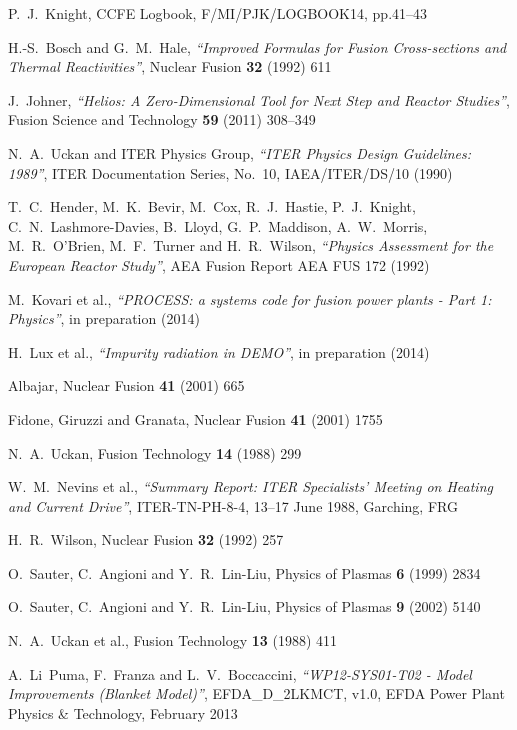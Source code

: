 \documentclass[11pt,a4paper]{report}
\begin{document}
\begin{thebibliography}{99}
P.\ J.\ Knight, CCFE Logbook, F/MI/PJK/LOGBOOK14, pp.41--43

H.-S.\ Bosch and G.\ M.\ Hale,
\textit{``Improved Formulas for Fusion Cross-sections and Thermal Reactivities''},
Nuclear Fusion \textbf{32} (1992) 611

J.\ Johner,
\textit{``Helios: A Zero-Dimensional Tool for Next Step and Reactor Studies''},
Fusion Science and Technology \textbf{59} (2011) 308--349

N.\ A.\ Uckan and ITER Physics Group,
\textit{``ITER Physics Design Guidelines: 1989''},
ITER Documentation Series, No.\ 10, IAEA/ITER/DS/10
(1990)

T.\ C.\ Hender, M.\ K.\ Bevir, M.\ Cox, R.\ J.\ Hastie, P.\ J.\
Knight, C.\ N.\ Lashmore-Davies, B.\ Lloyd, G.\ P.\ Maddison, A.\ W.\
Morris, M.\ R.\ O'Brien, M.\ F.\ Turner and H.\ R.\ Wilson,
\textit{``Physics Assessment for the European Reactor Study''},
AEA Fusion Report AEA FUS 172
(1992)

M.\ Kovari et al.,
\textit{``PROCESS: a systems code for fusion power plants - Part 1: Physics''},
in preparation (2014)

H.\ Lux et al.,
\textit{``Impurity radiation in DEMO''},
in preparation (2014)

Albajar,
Nuclear Fusion \textbf{41} (2001) 665

Fidone, Giruzzi and Granata,
Nuclear Fusion \textbf{41} (2001) 1755

N.\ A.\ Uckan,
Fusion Technology \textbf{14} (1988) 299

W.\ M.\ Nevins et al.,
\textit{``Summary Report: ITER Specialists' Meeting on Heating and
Current Drive''},
ITER-TN-PH-8-4,
13--17 June 1988, Garching, FRG

H.\ R.\ Wilson,
Nuclear Fusion \textbf{32} (1992) 257

O.\ Sauter, C.\ Angioni and Y.\ R.\ Lin-Liu,
Physics of Plasmas \textbf{6} (1999) 2834

O.\ Sauter, C.\ Angioni and Y.\ R.\ Lin-Liu,
Physics of Plasmas \textbf{9} (2002) 5140

N.\ A.\ Uckan et al.,
Fusion Technology \textbf{13} (1988) 411

A.\ Li~Puma, F.\ Franza and L.\ V.\ Boccaccini, \textit{``WP12-SYS01-T02 -
  Model Improvements (Blanket Model)''},
EFDA\_D\_2LKMCT, v1.0, EFDA Power Plant Physics \& Technology, February 2013


\end{thebibliography}
\end{document}
